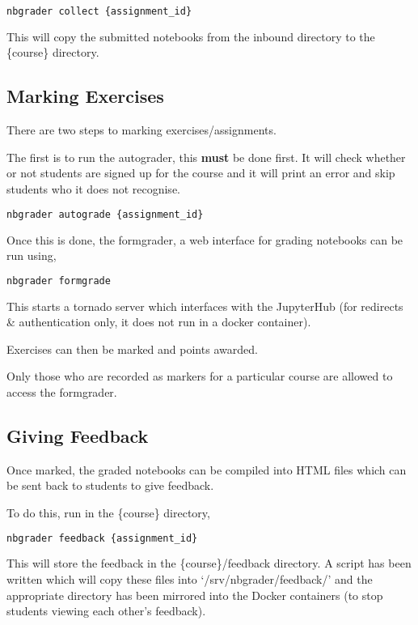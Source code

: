     \begin{lstlisting}[frame=single,language=Bash]
    nbgrader collect {assignment_id}
    \end{lstlisting}
    
    This will copy the submitted notebooks from the inbound directory to the \{course\} directory.
    
    \subsection{Marking Exercises}
    
    There are two steps to marking exercises/assignments.
    
    The first is to run the autograder, this \textbf{must} be done first. It will check whether or not students are signed up for the course and it will print an error and skip students who it does not recognise.
    
    \begin{lstlisting}[frame=single,language=Bash]
    nbgrader autograde {assignment_id}
    \end{lstlisting}
    
    Once this is done, the formgrader, a web interface for grading notebooks can be run using,
    
    \begin{lstlisting}[frame=single,language=Bash]
    nbgrader formgrade
    \end{lstlisting}

    This starts a tornado server which interfaces with the JupyterHub (for redirects \& authentication only, it does not run in a docker container).
    
    Exercises can then be marked and points awarded.
    
    Only those who are recorded as markers for a particular course are allowed to access the formgrader.
    
    \subsection{Giving Feedback}
    
    Once marked, the graded notebooks can be compiled into HTML files which can be sent back to students to give feedback.
    
    To do this, run in the \{course\} directory,
    
    \begin{lstlisting}[frame=single,language=Bash]
    nbgrader feedback {assignment_id}
    \end{lstlisting}
    
    This will store the feedback in the \{course\}/feedback directory. A script has been written which will copy these files into `/srv/nbgrader/feedback/' and the appropriate directory has been mirrored into the Docker containers (to stop students viewing each other's feedback).
    